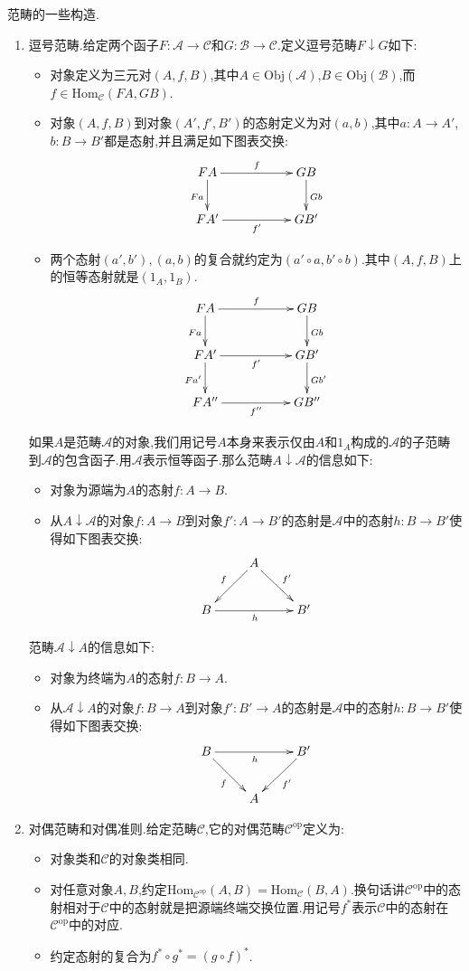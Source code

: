 范畴的一些构造.
\begin{enumerate}
	\item 逗号范畴.给定两个函子$F:\mathscr{A}\to\mathscr{C}$和$G:\mathscr{B}\to\mathscr{C}$.定义逗号范畴$F\downarrow G$如下:
	\begin{itemize}
		\item 对象定义为三元对$(A,f,B)$,其中$A\in\mathrm{Obj}(\mathscr{A})$,$B\in\mathrm{Obj}(\mathscr{B})$,而$f\in\mathrm{Hom}_{\mathscr{C}}(FA,GB)$.
		\item 对象$(A,f,B)$到对象$(A',f',B')$的态射定义为对$(a,b)$,其中$a:A\to A'$,$b:B\to B'$都是态射,并且满足如下图表交换:
		$$\xymatrix{FA\ar[rr]^f\ar[d]_{Fa}&&GB\ar[d]^{Gb}\\FA'\ar[rr]_{f'}&&GB'}$$
		\item 两个态射$(a',b'),(a,b)$的复合就约定为$(a'\circ a,b'\circ b)$.其中$(A,f,B)$上的恒等态射就是$(1_A,1_B)$.
		$$\xymatrix{FA\ar[rr]^f\ar[d]_{Fa}&&GB\ar[d]^{Gb}\\FA'\ar[rr]_{f'}\ar[d]_{Fa'}&&GB'\ar[d]^{Gb'}\\FA''\ar[rr]_{f''}&&GB''}$$
	\end{itemize}
	
	如果$A$是范畴$\mathscr{A}$的对象,我们用记号$A$本身来表示仅由$A$和$1_A$构成的$\mathscr{A}$的子范畴到$\mathscr{A}$的包含函子.用$\mathscr{A}$表示恒等函子.那么范畴$A\downarrow\mathscr{A}$的信息如下:
	\begin{itemize}
		\item 对象为源端为$A$的态射$f:A\to B$.
		\item 从$A\downarrow\mathscr{A}$的对象$f:A\to B$到对象$f':A\to B'$的态射是$\mathscr{A}$中的态射$h:B\to B'$使得如下图表交换:
		$$\xymatrix{&A\ar[dl]_f\ar[dr]^{f'}&\\B\ar[rr]_h&&B'}$$
	\end{itemize}
	
	范畴$\mathscr{A}\downarrow A$的信息如下:
	\begin{itemize}
		\item 对象为终端为$A$的态射$f:B\to A$.
		\item 从$\mathscr{A}\downarrow A$的对象$f:B\to A$到对象$f':B'\to A$的态射是$\mathscr{A}$中的态射$h:B\to B'$使得如下图表交换:
		$$\xymatrix{B\ar[rr]_h\ar[dr]_f&&B'\ar[dl]^{f'}\\&A&}$$
	\end{itemize}
	\item 对偶范畴和对偶准则.给定范畴$\mathscr{C}$,它的对偶范畴$\mathscr{C}^{\mathrm{op}}$定义为:
	\begin{itemize}
		\item 对象类和$\mathscr{C}$的对象类相同.
		\item 对任意对象$A,B$,约定$\mathrm{Hom}_{\mathscr{C}^{\mathrm{op}}}(A,B)=\mathrm{Hom}_{\mathscr{C}}(B,A)$.换句话讲$\mathscr{C}^{\mathrm{op}}$中的态射相对于$\mathscr{C}$中的态射就是把源端终端交换位置.用记号$f^*$表示$\mathscr{C}$中的态射在$\mathscr{C}^{\mathrm{op}}$中的对应.
		\item 约定态射的复合为$f^*\circ g^*=(g\circ f)^*$.
	\end{itemize}
	

\end{enumerate}

